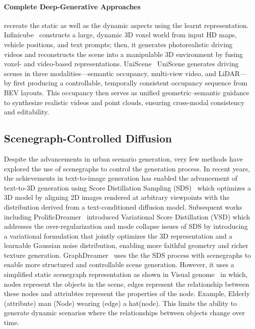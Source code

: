 \documentclass{article}
\begin{document}
\paragraph{Complete Deep-Generative Approaches} recreate the static as well as the dynamic aspects using the learnt representation. Infinicube~\cite{lu2024infinicube} constructs a large, dynamic 3D voxel world from input HD maps, vehicle positions, and text prompts; then, it generates photorealistic driving videos and reconstructs the scene into a manipulable 3D environment by fusing voxel- and video-based representations. UniScene~\cite{li2025uniscene} UniScene generates driving scenes in three modalities—semantic occupancy, multi-view video, and LiDAR—by first producing a controllable, temporally consistent occupancy sequence from BEV layouts. This occupancy then serves as unified geometric–semantic guidance to synthesize realistic videos and point clouds, ensuring cross-modal consistency and editability.

\subsection{Scenegraph-Controlled Diffusion}

Despite the advancements in urban scenario generation, very few methods have explored the use of scenegraphs to control the generation process. In recent years, the achievements in text-to-image generation has enabled the advancement of text-to-3D generation using Score Distillation Sampling (SDS)~\cite{poole2022dreamfusion} which optimizes a 3D model by aligning 2D images rendered at arbitrary viewpoints with the distribution derived from a text-conditioned diffusion model. Subsequent works including ProlificDreamer~\cite{wang2023prolificdreamer} introduced Variational Score Distillation (VSD) which addresses the over-regularization and mode collapse issues of SDS by introducing a variational formulation that jointly optimizes the 3D representation and a learnable Gaussian noise distribution, enabling more faithful geometry and richer texture generation. GraphDreamer~\cite{gao2024graphdreamer}  uses the the SDS process with scenegraphs to enable more structured and controllable scene generation. However, it uses a simplified static scenegraph representation as shown in Visual genome~\cite{krishna2017visual} in which, nodes represent the objects in the scene, edges represent the relationship between these nodes and attriubtes represent the properties of the node. Example, Elderly (attribute) man (Node) wearing (edge) a hat(node). This limits the ability to generate dynamic scenarios where the relationships between objects change over time.
\end{document}
